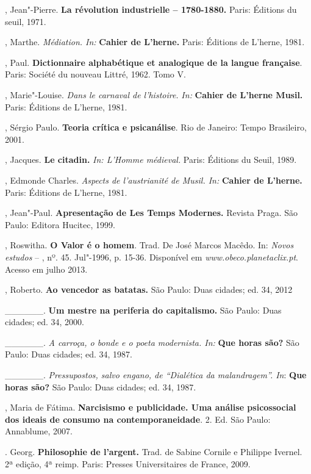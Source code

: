 \begin{Parskip}
, Jean"-Pierre. \textbf{La révolution industrielle -- 1780-1880.}
Paris: Éditions du seuil, 1971.

, Marthe. \emph{Médiation. In:} \textbf{Cahier de L'herne.} Paris:
Éditions de L'herne, 1981.

, Paul. \textbf{Dictionnaire alphabétique et analogique de la
langue française}. Paris: Société du nouveau Littré, 1962. Tomo V.

, Marie"-Louise. \emph{Dans le carnaval de l'histoire.} \emph{In:}
\textbf{Cahier de L'herne Musil.} Paris: Éditions de L'herne, 1981.

, Sérgio Paulo. \textbf{Teoria crítica e psicanálise}. Rio de
Janeiro: Tempo Brasileiro, 2001.

, Jacques. \textbf{Le citadin.} \emph{In: L'Homme médieval.}
Paris: Éditions du Seuil, 1989.

, Edmonde Charles. \emph{Aspects de l'austrianité de Musil. In:}
\textbf{Cahier de L'herne.} Paris: Éditions de L'herne, 1981.

, Jean"-Paul. \textbf{Apresentação de Les Temps Modernes.} Revista
Praga. São Paulo: Editora Hucitec, 1999.

, Roswitha. \textbf{O Valor é o homem}. Trad. De José Marcos
Macêdo. In: \emph{Novos} \emph{estudos} -- , nº. 45. Jul"-1996, p.
15-36. Disponível em
\emph{www.obeco.planetaclix.pt}. Acesso em julho 2013.

, Roberto. \textbf{Ao vencedor as batatas.} São Paulo: Duas
cidades; ed. 34, 2012

\_\_\_\_\_\_. \textbf{Um mestre na periferia do capitalismo.} São Paulo:
Duas cidades; ed. 34, 2000.

\_\_\_\_\_\_. \emph{A carroça, o bonde e o poeta modernista. In:}
\textbf{Que horas são?} São Paulo: Duas cidades; ed. 34, 1987.

\_\_\_\_\_\_. \emph{Pressupostos, salvo engano, de ``Dialética da
malandragem''. In}: \textbf{Que horas são?} São Paulo: Duas cidades; ed.
34, 1987.

, Maria de Fátima. \textbf{Narcisismo e publicidade. Uma
análise psicossocial dos ideais de consumo na contemporaneidade}. 2. Ed.
São Paulo: Annablume, 2007.

. Georg. \textbf{Philosophie de l'argent.} Trad. de Sabine Cornile
e Philippe Ivernel. 2ª edição, 4ª reimp. Paris: Presses Universitaires
de France, 2009.


\end{Parskip}

